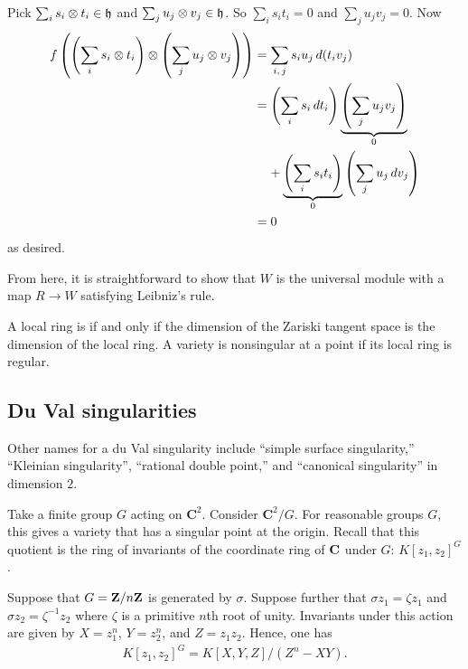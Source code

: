 \documentclass [11 pt, oneside] {article}
\begin{document}
Pick $\sum_{i}^{} s_i\otimes t_i\in \mathfrak{h}$ and $\sum_{j}^{} u_j\otimes v_j\in \mathfrak{h}$. So $\sum_{i}^{} s_it_i=0$ and $\sum_{j}^{} u_jv_j=0$. Now
\begin{align*}
	f \left( \left( \sum_{i}^{} s_i\otimes t_i \right)\otimes \left( \sum_{j}^{} u_j\otimes v_j \right)  \right)&= \sum_{i,\,j}^{} s_iu_j\, d(t_iv_j) \\
														   &= \left( \sum_{i}^{} s_i\, dt_i \right) \underbrace{\left( \sum_{j}^{} u_jv_j \right)}_{0} \\ &\phantom{=}\ + \underbrace{\left( \sum_{i}^{} s_it_i \right)}_{0} \left( \sum_{j}^{} u_j\, dv_j \right) \\
														   &=0
\end{align*}
as desired.

From here, it is straightforward to show that $W$ is the universal module with a map $R\longrightarrow W$ satisfying Leibniz's rule.


\begin{remark}
	A local ring is  if and only if the dimension of the Zariski tangent space is the dimension of the local ring. A variety is nonsingular at a point if its local ring is regular.
\end{remark}

\subsection{Du Val singularities}
Other names for a du Val singularity include ``simple surface singularity,'' ``Kleinian singularity'', ``rational double point,'' and ``canonical singularity'' in dimension $2$.

Take a finite group $G$ acting on $\mathbf{C}^2$. Consider $\mathbf{C}^2/G$. For reasonable groups $G$, this gives a variety that has a singular point at the origin. Recall that this quotient is the ring of invariants of the coordinate ring of $\mathbf C$ under $G$: $K[z_1,z_2]^G$. 

Suppose that $G=\mathbf Z / n\mathbf Z$ is generated by $\sigma$. Suppose further that $\sigma z_1 = \zeta z_1$ and $\sigma z_2 =\zeta^{-1}z_2$ where $\zeta$ is a primitive $n$th root of unity. Invariants under this action are given by $X =z_1^n$, $Y=z_2^n$, and $Z=z_1z_2$. Hence, one has
\begin{align*}
	K[z_1,z_2]^G = K[X,Y,Z] / (Z^n- XY).
\end{align*}
\end{document}

